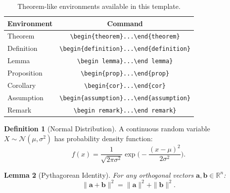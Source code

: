 \documentclass[]{fairmeta} %
\theoremstyle{plain}
\newtheorem{theorem}{Theorem}[section]
\newtheorem{lemma}[theorem]{Lemma}
\theoremstyle{definition}
\newtheorem{definition}[theorem]{Definition}
\newtheorem{assumption}[theorem]{Assumption}
\theoremstyle{remark}
\begin{document}
\begin{table}[htbp]
  \centering
  \small
  \begin{tabular}{lc}
    \toprule
    Environment & Command \\
    \midrule
    Theorem & \verb|\begin{theorem}...\end{theorem}| \\
    Definition & \verb|\begin{definition}...\end{definition}| \\
    Lemma & \verb|\begin lemma}...\end lemma}| \\
    Proposition & \verb|\begin{prop}...\end{prop}| \\
    Corollary & \verb|\begin{cor}...\end{cor}| \\
    Assumption & \verb|\begin{assumption}...\end{assumption}| \\
    Remark & \verb|\begin remark}...\end remark}| \\
    \bottomrule
  \end{tabular}
  \caption{Theorem-like environments available in this template.}
  \label{tab:environments}
\end{table}

\bigskip

\begin{definition}[Normal Distribution]
\label{def:normal}
A continuous random variable $X \sim \mathcal{N}(\mu, \sigma^2)$ has probability density function:
\begin{equation}
    f(x) = \frac{1}{\sqrt{2\pi\sigma^2}} \exp\!\Big(-\frac{(x-\mu)^2}{2\sigma^2}\Big).
    \label{eq:normal_pdf}
\end{equation}
\end{definition}

\begin{lemma}[Pythagorean Identity]
\label{lm:pythagorean}
For any orthogonal vectors $\mathbf{a}, \mathbf{b} \in \mathbb{R}^n$:
\begin{equation}
    \|\mathbf{a} + \mathbf{b}\|^2 = \|\mathbf{a}\|^2 + \|\mathbf{b}\|^2.
    \label{eq:pythagorean}
\end{equation}
\end{lemma}
\end{document}
